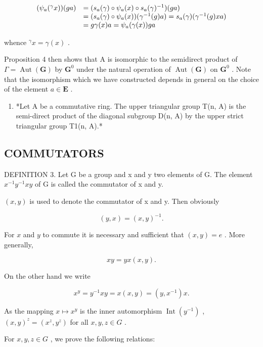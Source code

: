 \[
\begin{array}{r l} (\psi_ {a} (^ {\gamma} x)) (g a) & = (s _ {a} (\gamma) \circ \psi_ {a} (x) \circ s _ {a} (\gamma) ^ {- 1}) (g a) \\ & = (s _ {a} (\gamma) \circ \psi_ {a} (x)) (\gamma^ {- 1} (g) a) = s _ {a} (\gamma) (\gamma^ {- 1} (g) x a) \\ & = g \gamma (x) a = \psi_ {a} (\gamma (x)) g a \end{array}
\]

whence \({}^{\gamma}x = \gamma(x)\) .

Proposition 4 then shows that A is isomorphic to the semidirect product of \(\Gamma = \operatorname{Aut}(\mathbf{G})\) by \(\mathbf{G}^0\) under the natural operation of \(\operatorname{Aut}(\mathbf{G})\) on \(\mathbf{G}^0\) . Note that the isomorphism which we have constructed depends in general on the choice of the element \(a \in \mathbf{E}\) .

\begin{enumerate}
\def\labelenumi{(\arabic{enumi})}
\setcounter{enumi}{1}
\tightlist
\item
  *Let A be a commutative ring. The upper triangular group T(n, A) is the semi-direct product of the diagonal subgroup D(n, A) by the upper strict triangular group T1(n, A).*
\end{enumerate}

\subsection{COMMUTATORS}

DEFINITION 3. Let G be a group and x and y two elements of G. The element \(x^{-1}y^{-1}xy\) of G is called the commutator of x and y.

\((x,y)\) is used to denote the commutator of x and y. Then obviously

\[
(y, x) = (x, y) ^ {- 1}.
\]

For \(x\) and \(y\) to commute it is necessary and sufficient that \((x, y) = e\) . More generally,

\[
x y = y x (x, y).
\]

On the other hand we write

\[
x ^ {y} = y ^ {- 1} x y = x (x, y) = (y, x ^ {- 1}) x.\tag{3}
\]

As the mapping \(x \mapsto x^y\) is the inner automorphism \(\operatorname{Int}(y^{-1})\) , \((x, y)^z = (x^z, y^z)\) for all \(x, y, z \in G\) .

For \(x, y, z \in G\) , we prove the following relations:

